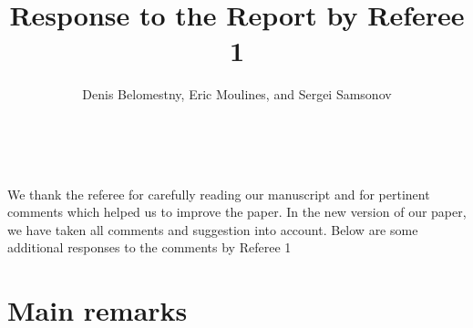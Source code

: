 \documentclass{article}%
\begin{document}
\title{\textbf{Response to the Report by Referee 1}}
\author{{\normalsize \vspace{-1cm} Denis Belomestny, Eric Moulines, and Sergei Samsonov}}
\date{~ }
\maketitle

\vspace{-0.5cm}

We thank the referee for carefully reading our manuscript and for pertinent
comments which helped us to improve the paper. In the new version of our
paper, we have taken all comments and suggestion into account.  Below are some additional responses to the
comments by Referee 1

\section*{Main remarks}
\end{document}
